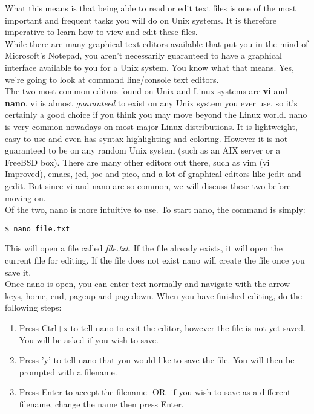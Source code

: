 What this means is that being able to read or edit text files is one of the most important and frequent tasks you will do on Unix systems.  It is therefore imperative to learn how to view and edit these files.\\

While there are many graphical text editors available that put you in the mind of Microsoft's Notepad, you aren't necessarily guaranteed to have a graphical interface available to you for a Unix system.  You know what that means.  Yes, we're going to look at command line/console text editors.\\

The two most common editors found on Unix and Linux systems are \textbf{vi} and \textbf{nano}.  vi is almost \textit{guaranteed} to exist on any Unix system you ever use, so it's certainly a good choice if you think you may move beyond the Linux world.  nano is very common nowadays on most major Linux distributions.  It is lightweight, easy to use and even has syntax highlighting and coloring.  However it is not guaranteed to be on any random Unix system (such as an AIX server or a FreeBSD box).  There are many other editors out there, such as vim (vi Improved), emacs, jed, joe and pico, and a lot of graphical editors like jedit and gedit.  But since vi and nano are so common, we will discuss these two before moving on.\\

Of the two, nano is more intuitive to use.  To start nano, the command is simply:

\begin{verbatim}
$ nano file.txt
\end{verbatim}

This will open a file called \textit{file.txt}.  If the file already exists, it will open the current file for editing.  If the file does not exist nano will create the file once you save it.\\

Once nano is open, you can enter text normally and navigate with the arrow keys, home, end, pageup and pagedown.  When you have finished editing, do the following steps:

\begin{enumerate}
\item Press Ctrl+x to tell nano to exit the editor, however the file is not yet saved.  You will be asked if you wish to save.
\item Press 'y' to tell nano that you would like to save the file. You will then be prompted with a filename.
\item Press Enter to accept the filename -OR- if you wish to save as a different filename, change the name then press Enter.
\end{enumerate}

